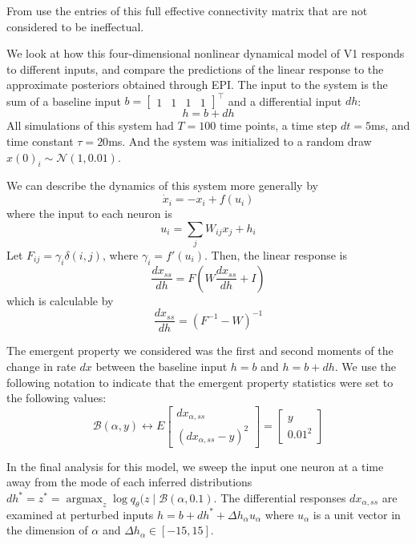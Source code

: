 \documentclass[11pt]{article}
\DeclareMathOperator*{\argmax}{argmax}
\begin{document}
From use the entries of this full effective connectivity matrix that are not considered to be ineffectual.

We look at how this four-dimensional nonlinear dynamical model of V1 responds to different inputs, and compare the predictions of the linear response to the approximate posteriors obtained through EPI.  The input to the system is the sum of a baseline input $b = \begin{bmatrix} 1 & 1 & 1 & 1 \end{bmatrix}^\top$ and a differential input $dh$:
\begin{equation}
h = b + dh
\end{equation}
All simulations of this system had $T=100$ time points, a time step $dt = 5$ms, and time constant $\tau = 20$ms.  And the system was initialized to a random draw $x(0)_i \sim \mathcal{N}(1, 0.01)$.

We can describe the dynamics of this system more generally by
\begin{equation}
\dot{x}_i = -x_i + f(u_i)
\end{equation}
where the input to each neuron is
\begin{equation}
u_i = \sum_j W_{ij} x_j + h_i
\end{equation}
Let $F_{ij} = \gamma_i \delta(i,j)$, where $\gamma_i = f'(u_i)$.  Then, the linear response is
\begin{equation}
\frac{dx_{ss}}{dh} = F(W\frac{dx_{ss}}{dh} + I)
\end{equation}
which is calculable by
\begin{equation}
\frac{dx_{ss}}{dh} = (F^{-1} - W)^{-1}
\end{equation}

The emergent property we considered was the first and second moments of the change in rate $dx$ between the baseline input $h= b$ and $h = b + dh$.  We use the following notation to indicate that the emergent property statistics were set to the following values:
\begin{equation}
\mathcal{B}(\alpha, y) \leftrightarrow 
E \begin{bmatrix} dx_{\alpha,ss} \\ (dx_{\alpha,ss} - y)^2 \end{bmatrix} = \begin{bmatrix} y \\ 0.01^2 \end{bmatrix}
\end{equation}

In the final analysis for this model, we sweep the input one neuron at a time away from the mode of each inferred distributions $dh^* = z^* = \argmax_{z} \log q_\theta(z \mid \mathcal{B}(\alpha, 0.1)$.
The differential responses $dx_{\alpha,ss}$ are examined at perturbed inputs  $h = b + dh^* + \Delta h_\alpha u_\alpha$ where $u_\alpha$ is a unit vector in the dimension of $\alpha$ and $\Delta h_\alpha \in \left[-15,15\right]$.
\end{document}
